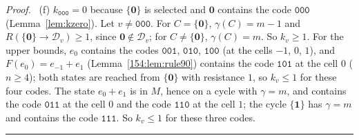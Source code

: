 \documentclass[10pt,a4paper]{article}
\newcommand{\qedmark}{\rule{1.1ex}{1.1ex}}
\newenvironment{proof}[1][Proof]{\par\smallskip\noindent\textit{#1.}\ }{\hfill\qedmark\par\smallskip}
\newcommand{\zero}{\mathbf{0}}                %
\newcommand{\one}{\mathbf{1}}                 %
\newcommand{\Dc}[1]{\mathcal{D}_{#1}}         %
\newcommand{\code}[1]{\mathtt{#1}}            %
\begin{document}
\begin{proof}
(f) $k_{\code{000}}=0$ because $\{\zero\}$ is selected and $\zero$ contains the code $\code{000}$
(Lemma~\ref{lem:kzero}). Let
$v\neq\code{000}$. For $C=\{\zero\}$, $\gamma(C)=m-1$ and $R(\{\zero\}\to\Dc{v})\ge 1$, since $\zero\notin\Dc{v}$;
for $C\neq\{\zero\}$, $\gamma(C)=m$. So $k_v\ge 1$. For the upper bounds, $e_0$ contains the codes $\code{001}$,
$\code{010}$, $\code{100}$ (at the cells $-1$, $0$, $1$), and $F(e_0)=e_{-1}+e_1$ (Lemma~\ref{154:lem:rule90})
contains the code $\code{101}$ at the cell $0$ ($n\ge 4$); both states are reached from $\{\zero\}$ with resistance
$1$, so $k_v\le 1$ for these four codes. The state $e_0+e_1$ is in $M$, hence on a cycle with $\gamma=m$, and
contains the code $\code{011}$ at the cell $0$ and the code $\code{110}$ at the cell $1$; the cycle $\{\one\}$ has
$\gamma=m$ and contains the code $\code{111}$. So $k_v\le 1$ for these three codes.
\end{proof}
\end{document}

